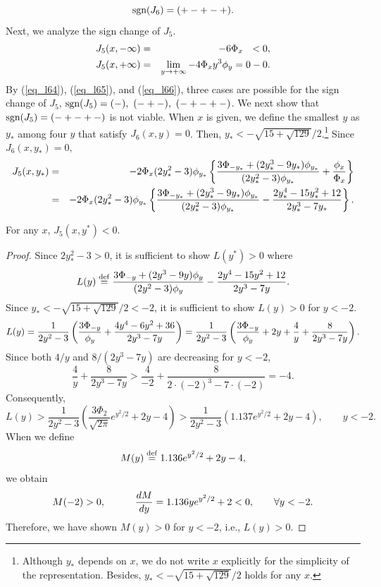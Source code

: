 \begin{equation}\label{eq_l64}
 \mbox{sgn}(J_6) = (+-+-+).
\end{equation}
Next, we analyze the sign change of $J_5$.
\begin{eqnarray}
  J_5(x,-\infty) & = & - 6 \Phi_x \ \ < 0, \label{eq_l65} \\
  J_5(x,+\infty) & = & \lim_{y \rightarrow +\infty} -4 \Phi_x y^3 \phi_y = 0-0. \label{eq_l66}
\end{eqnarray}
By (\ref{eq_l64}), (\ref{eq_l65}), and (\ref{eq_l66}), three cases are possible for the sign change of $J_5$, $\mbox{sgn}(J_5)=(-),\ (-+-),\ (-+-+-)$.  We next show that $\mbox{sgn}(J_5)=(-+-+-)$ is not viable.  When $x$ is given, we define the smallest $y$ as $y_*$ among four $y$ that satisfy $J_6(x,y)=0$.  Then, $y_*<-\sqrt{15+\sqrt{129}}/2$.\footnote{Although $y_*$ depends on $x$, we do not write $x$ explicitly for the simplicity of the representation.  Besides, $y_*<-\sqrt{15+\sqrt{129}}/2$ holds for any $x$.}
Since $J_6(x,y_*)=0,$
\begin{eqnarray*}  
  J_5(x,y_*)
   & = & - 2 \Phi_x (2y_*^2-3) \phi_{y_*} \left\{ \frac{3 \Phi_{-y_*} + (2y_*^3-9y_*)\phi_{y_*}}{(2y_*^2-3)\phi_{y_*}}
         + \frac{\phi_x}{\Phi_x} \right\} \\
   & = & - 2 \Phi_x (2y_*^2-3) \phi_{y_*} \left\{ \frac{3\Phi_{-y_*} + (2y_*^3-9y_*)\phi_{y_*}}{(2y_*^2-3)\phi_{y_*}}
         - \frac{2y_*^4-15y_*^2+12}{2y_*^3-7y_*} \right\}.
\end{eqnarray*}

\begin{lemma}\label{lem_l3}
 \quad For any $x$, $J_5(x,y^*)<0.$
\end{lemma}

\begin{proof}
Since $2y_*^2-3>0$, it is sufficient to show $L(y^*)>0$ where
\[
  L(y) \stackrel{\mathrm{def}}{=} \frac{3\Phi_{-y} + (2y^3-9y)\phi_{y}}{(2y^2-3)\phi_{y}} - \frac{2y^4-15y^2+12}{2y^3-7y}.
\]
Since $y_* < -\sqrt{15+\sqrt{129}}/2<-2$, it is sufficient to show $L(y)>0$ for $y<-2$.
\[
 L(y) = \frac{1}{2y^2-3} \left( \frac{3\Phi_{-y}}{\phi_y} + \frac{4y^4-6y^2+36}{2y^3-7y} \right)
      = \frac{1}{2y^2-3} \left( \frac{3\Phi_{-y}}{\phi_y} + 2y + \frac{4}{y} + \frac{8}{2y^3-7y} \right).
\]
Since both $4/y$ and $8/(2y^3-7y)$ are decreasing for $y<-2$,
\[
 \frac{4}{y} + \frac{8}{2y^3-7y} > \frac{4}{-2} + \frac{8}{2 \cdot (-2)^3-7 \cdot (-2)} = -4.
\]
Consequently,
\[
 L(y) > \frac{1}{2y^2-3} \left( \frac{3 \Phi_{2}}{\sqrt{2\pi}} e^{y^2/2} + 2y -4 \right)
      > \frac{1}{2y^2-3} \left( 1.137 e^{y^2/2} + 2y -4 \right), \qquad y < -2.
\]
When we define
\[
 M(y) \stackrel{\mathrm{def}}{=} 1.136 e^{y^2/2} + 2y -4,
\]
we obtain
\[
 M(-2) > 0, \qquad\quad
 \frac{d M}{d y} = 1.136 y e^{y^2/2} + 2 < 0, \qquad \forall y<-2.
\]
Therefore, we have shown $M(y)>0$ for $y<-2$, i.e., $L(y)>0$.
\end{proof}

